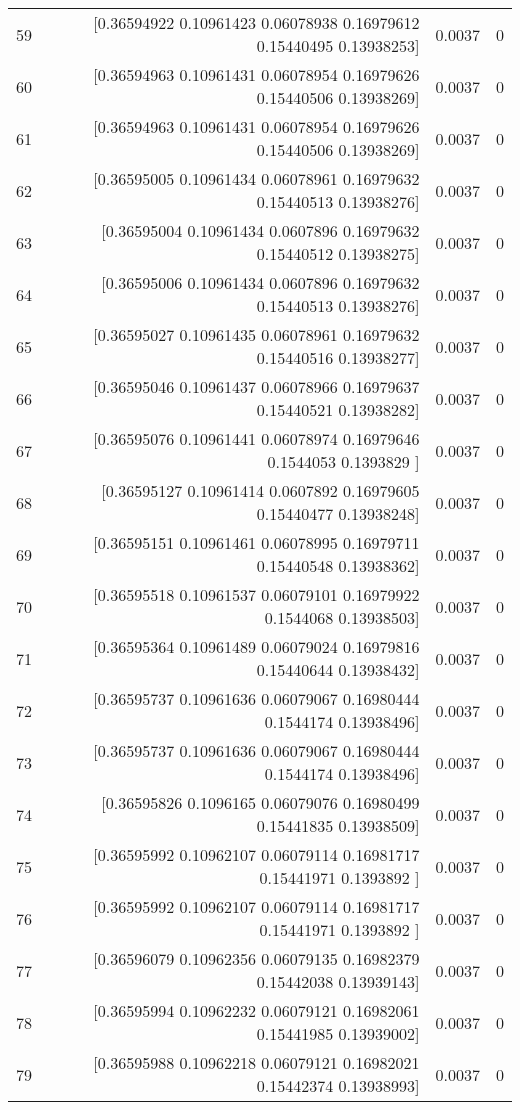 \begin{longtable}{lrrr}
59 & [0.36594922 0.10961423 0.06078938 0.16979612 0.15440495 0.13938253] & 0.0037 & 0 \\
60 & [0.36594963 0.10961431 0.06078954 0.16979626 0.15440506 0.13938269] & 0.0037 & 0 \\
61 & [0.36594963 0.10961431 0.06078954 0.16979626 0.15440506 0.13938269] & 0.0037 & 0 \\
62 & [0.36595005 0.10961434 0.06078961 0.16979632 0.15440513 0.13938276] & 0.0037 & 0 \\
63 & [0.36595004 0.10961434 0.0607896  0.16979632 0.15440512 0.13938275] & 0.0037 & 0 \\
64 & [0.36595006 0.10961434 0.0607896  0.16979632 0.15440513 0.13938276] & 0.0037 & 0 \\
65 & [0.36595027 0.10961435 0.06078961 0.16979632 0.15440516 0.13938277] & 0.0037 & 0 \\
66 & [0.36595046 0.10961437 0.06078966 0.16979637 0.15440521 0.13938282] & 0.0037 & 0 \\
67 & [0.36595076 0.10961441 0.06078974 0.16979646 0.1544053  0.1393829 ] & 0.0037 & 0 \\
68 & [0.36595127 0.10961414 0.0607892  0.16979605 0.15440477 0.13938248] & 0.0037 & 0 \\
69 & [0.36595151 0.10961461 0.06078995 0.16979711 0.15440548 0.13938362] & 0.0037 & 0 \\
70 & [0.36595518 0.10961537 0.06079101 0.16979922 0.1544068  0.13938503] & 0.0037 & 0 \\
71 & [0.36595364 0.10961489 0.06079024 0.16979816 0.15440644 0.13938432] & 0.0037 & 0 \\
72 & [0.36595737 0.10961636 0.06079067 0.16980444 0.1544174  0.13938496] & 0.0037 & 0 \\
73 & [0.36595737 0.10961636 0.06079067 0.16980444 0.1544174  0.13938496] & 0.0037 & 0 \\
74 & [0.36595826 0.1096165  0.06079076 0.16980499 0.15441835 0.13938509] & 0.0037 & 0 \\
75 & [0.36595992 0.10962107 0.06079114 0.16981717 0.15441971 0.1393892 ] & 0.0037 & 0 \\
76 & [0.36595992 0.10962107 0.06079114 0.16981717 0.15441971 0.1393892 ] & 0.0037 & 0 \\
77 & [0.36596079 0.10962356 0.06079135 0.16982379 0.15442038 0.13939143] & 0.0037 & 0 \\
78 & [0.36595994 0.10962232 0.06079121 0.16982061 0.15441985 0.13939002] & 0.0037 & 0 \\
79 & [0.36595988 0.10962218 0.06079121 0.16982021 0.15442374 0.13938993] & 0.0037 & 0 \\

\end{longtable}
